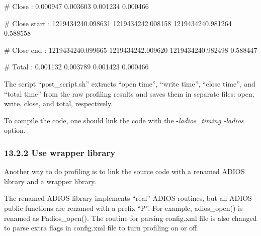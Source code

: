 \vspace{10pt}
{\small \# Close       :          0.000947                0.003603             
   0.001234                0.000466}

\vspace{10pt}
{\small \# Close start :          1219434240.098631       1219434242.008158    
   1219434240.981264       0.588558}

\vspace{10pt}
{\small \# Close end   :          1219434240.099665       1219434242.009620    
   1219434240.982498       0.588447}

\vspace{10pt}
{\small \# Total       :          0.001132                0.003789             
   0.001423                0.000466}


\vspace{23pt}
The script ``post\_script.sh'' extracts ``open time'', ``write time'', ``close 
time'', and ``total time'' from the raw profiling results and saves them in separate 
files: open, write, close, and total, respectively.\label{HToc212016692}\label{HToc212016815}\label{HToc212016934}\label{HToc212018088}

\vspace{10pt}
To compile the code, one should link the code with the -\textit{ladios\_timing 
-ladios} option. \label{HToc84890317}\label{HToc212016693}\label{HToc212016935}\label{HToc182553459}

\vspace{10pt}
\subsubsection*{{\large \textbf{13.2.2 Use wrapper library}}}

\vspace{10pt}
Another way to do profiling is to link the source code with a renamed ADIOS library 
and a wrapper library. 

\vspace{10pt}
The renamed ADIOS library implements ``real'' ADIOS routines, but all ADIOS public 
functions are renamed with a prefix ``P''. For example, adios\_open() is renamed 
as Padios\_open(). The routine for parsing config.xml file is also changed to parse 
extra flags in config.xml file to turn profiling on or off.

